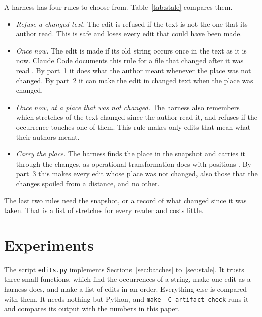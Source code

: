\documentclass[acmsmall,nonacm,screen]{acmart}
\begin{document}
A harness has four rules to choose from. Table~\ref{tab:stale} compares them.
\begin{itemize}
\item \emph{Refuse a changed text.} The edit is refused if the text is not the one that its
  author read. This is safe and loses every edit that could have been made.
\item \emph{Once now.} The edit is made if its old string occurs once in the text as it is
  now. Claude Code documents this rule for a file that changed after it was read
  \citep{claudecodetools}. By part~1 it does what the author meant whenever the place was not
  changed. By part~2 it can make the edit in changed text when the place was changed.
\item \emph{Once now, at a place that was not changed.} The harness also remembers which
  stretches of the text changed since the author read it, and refuses if the occurrence
  touches one of them. This rule makes only edits that mean what their authors meant.
\item \emph{Carry the place.} The harness finds the place in the snapshot and carries it
  through the changes, as operational transformation does with positions
  \citep{Ellis1989,Sun1998}. By part~3 this makes every edit whose place was not changed,
  also those that the changes spoiled from a distance, and no other.
\end{itemize}
The last two rules need the snapshot, or a record of what changed since it was taken. That is
a list of stretches for every reader and costs little.

\section{Experiments}\label{sec:experiments}

The script \texttt{edits.py} implements Sections~\ref{sec:batches} to~\ref{sec:stale}. It
trusts three small functions, which find the occurrences of a string, make one edit as a
harness does, and make a list of edits in an order. Everything else is compared with them. It
needs nothing but Python, and \texttt{make -C artifact check} runs it and compares its output
with the numbers in this paper.
\end{document}
